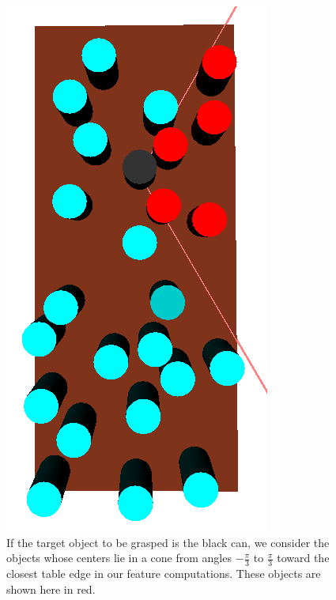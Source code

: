\begin{figure}[t]
  \centering
    \includegraphics[scale=0.3,angle=90]{images/feature_cone.png}
  \caption{\small{If the target object to be grasped is the black can, we consider the objects
whose centers lie in a cone from angles $-\frac{\pi}{3}$ to $\frac{\pi}{3}$ toward the closest table edge in
our feature computations. These objects are shown here in red.}}
  \label{fig:cone}
\end{figure}

